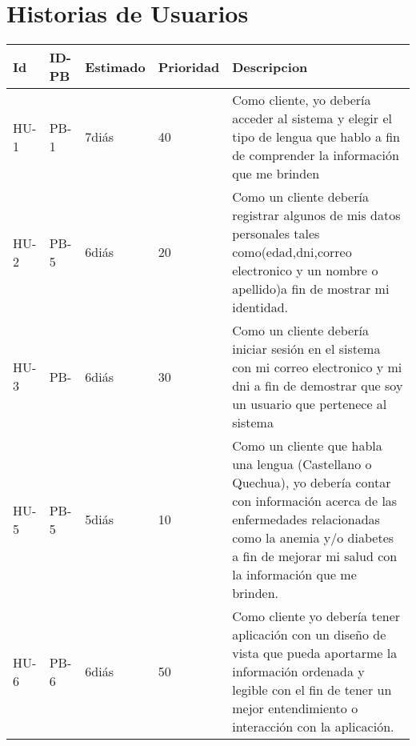 \chapter{Historias de Usuarios}
\begin{table}[htbp]
	\begin{center}
		\begin{tabular}{| p{1.8cm}| p{1.8cm}| p{1.8cm}|p{1.8cm} |p{7.8cm} |}
			\hline
		\textbf{Id} & \textbf{ID-PB} & \textbf {Estimado}& \textbf{Prioridad} & \textbf{Descripcion}
		\\\hline  
 		HU-1&PB-1& 7diás& 40&Como cliente, yo debería acceder al sistema y elegir el tipo de lengua que hablo a fin de comprender la información que me brinden
 \\ \hline
 	 	HU-2&PB-5& 6diás& 20&Como un cliente debería registrar algunos de mis datos personales tales como(edad,dni,correo electronico y un nombre o apellido)a fin de mostrar mi identidad.
 	 	 \\ \hline
 	 	HU-3&PB-& 6diás& 30&Como un cliente debería iniciar sesión en el sistema con mi correo electronico y mi dni a fin de demostrar que soy un usuario que pertenece al sistema 
 \\ \hline
	 	HU-5&PB-5& 5diás& 10&Como un cliente que habla una lengua (Castellano o Quechua), yo debería contar con información acerca de las enfermedades relacionadas como la anemia y/o diabetes a fin de mejorar mi salud con la información que me brinden. 
 \\ \hline
 		HU-6&PB-6& 6diás&50&Como cliente yo debería tener aplicación con un diseño de vista que pueda aportarme la información ordenada y legible con el fin de tener un mejor entendimiento o interacción con la aplicación.
  \\ \hline
		\end{tabular}
\end{center}
\end{table}